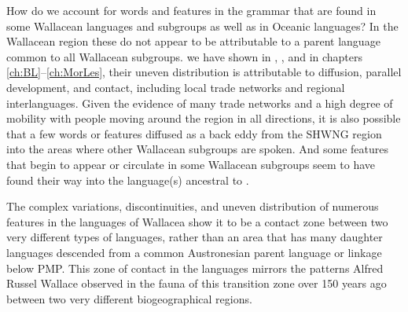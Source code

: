 How do we account for words
and features in the grammar that are found in some Wallacean
languages and subgroups as well as in Oceanic languages? In the Wallacean
region these do not appear to be attributable to a parent language
common to all Wallacean subgroups.
 we have shown in , ,
 and in chapters \ref{ch:BL}--\ref{ch:MorLes},
their uneven distribution is attributable to diffusion,
parallel development, and contact,
including local trade networks and regional interlanguages.
Given the evidence of many trade networks
and a high degree of mobility with people moving around the region
in all directions, it is also possible that a few words or features diffused as
a back eddy from the SHWNG region into the areas where other
Wallacean subgroups are spoken.
And some features that begin to appear or circulate in some Wallacean
subgroups seem to have found their way into the language(s) ancestral to .

The complex variations, discontinuities, and uneven distribution of numerous features
in the languages of Wallacea show it to be a contact zone between two very different
types of languages, rather than an area that has many daughter languages descended
from a common Austronesian parent language or linkage below PMP.
This zone of contact in the languages mirrors the patterns
Alfred Russel Wallace observed in the fauna of this transition
zone over 150 years ago between two very different biogeographical regions.